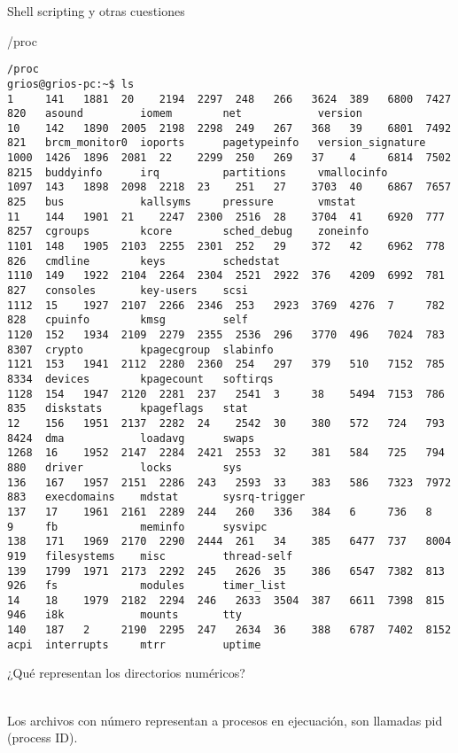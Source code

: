 \begin{section}{Shell scripting y otras cuestiones}
\begin{subsection}{/proc}
\begin{lstlisting}[style=Ubuntu]
/proc          
grios@grios-pc:~$ ls
1     141   1881  20    2194  2297  248   266   3624  389   6800  7427  820   asound         iomem        net            version
10    142   1890  2005  2198  2298  249   267   368   39    6801  7492  821   brcm_monitor0  ioports      pagetypeinfo   version_signature
1000  1426  1896  2081  22    2299  250   269   37    4     6814  7502  8215  buddyinfo      irq          partitions     vmallocinfo
1097  143   1898  2098  2218  23    251   27    3703  40    6867  7657  825   bus            kallsyms     pressure       vmstat
11    144   1901  21    2247  2300  2516  28    3704  41    6920  777   8257  cgroups        kcore        sched_debug    zoneinfo
1101  148   1905  2103  2255  2301  252   29    372   42    6962  778   826   cmdline        keys         schedstat
1110  149   1922  2104  2264  2304  2521  2922  376   4209  6992  781   827   consoles       key-users    scsi
1112  15    1927  2107  2266  2346  253   2923  3769  4276  7     782   828   cpuinfo        kmsg         self
1120  152   1934  2109  2279  2355  2536  296   3770  496   7024  783   8307  crypto         kpagecgroup  slabinfo
1121  153   1941  2112  2280  2360  254   297   379   510   7152  785   8334  devices        kpagecount   softirqs
1128  154   1947  2120  2281  237   2541  3     38    5494  7153  786   835   diskstats      kpageflags   stat
12    156   1951  2137  2282  24    2542  30    380   572   724   793   8424  dma            loadavg      swaps
1268  16    1952  2147  2284  2421  2553  32    381   584   725   794   880   driver         locks        sys
136   167   1957  2151  2286  243   2593  33    383   586   7323  7972  883   execdomains    mdstat       sysrq-trigger
137   17    1961  2161  2289  244   260   336   384   6     736   8     9     fb             meminfo      sysvipc
138   171   1969  2170  2290  2444  261   34    385   6477  737   8004  919   filesystems    misc         thread-self
139   1799  1971  2173  2292  245   2626  35    386   6547  7382  813   926   fs             modules      timer_list
14    18    1979  2182  2294  246   2633  3504  387   6611  7398  815   946   i8k            mounts       tty
140   187   2     2190  2295  247   2634  36    388   6787  7402  8152  acpi  interrupts     mtrr         uptime

\end{lstlisting}

\begin{quoting}
¿Qué representan los directorios numéricos?
\end{quoting}\\
Los archivos con número representan a procesos en ejecuación, son llamadas pid (process ID).



\end{subsection}
\end{section}
